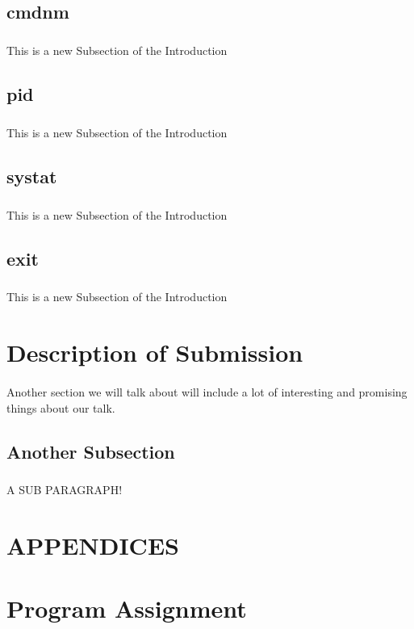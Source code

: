 \documentclass[10pt]{article}
\begin{document}
\subsection{cmdnm}
\subparagraph{}
This is a new Subsection of the Introduction

\subsection{pid}
\subparagraph{}
This is a new Subsection of the Introduction

\subsection{systat}
\subparagraph{}
This is a new Subsection of the Introduction

\subsection{exit}
\subparagraph{}
This is a new Subsection of the Introduction

\section{Description of Submission}
\paragraph{}
Another section we will talk about will include a lot of interesting and promising things about our talk.


\subsection{Another Subsection}
\subparagraph{}
A SUB PARAGRAPH!

\section{APPENDICES}
\appendix

\section{Program Assignment}

\end{document}
